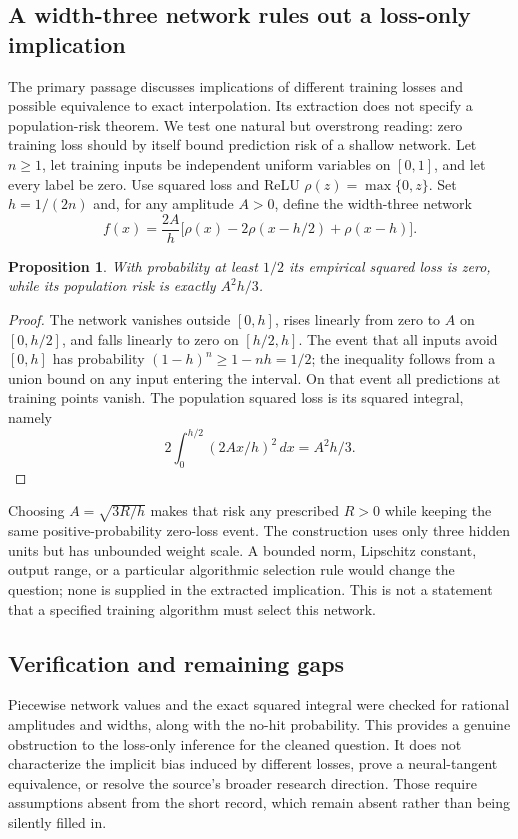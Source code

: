 \documentclass[11pt]{article}
\newtheorem{proposition}{Proposition}
\begin{document}
\subsection{A width-three network rules out a loss-only implication}
The primary passage discusses implications of different training losses and possible equivalence to exact interpolation. Its extraction does not specify a population-risk theorem. We test one natural but overstrong reading: zero training loss should by itself bound prediction risk of a shallow network.
Let $n\ge1$, let training inputs be independent uniform variables on $[0,1]$, and let every label be zero. Use squared loss and ReLU $\rho(z)=\max\{0,z\}$. Set $h=1/(2n)$ and, for any amplitude $A>0$, define the width-three network
\[
f(x)=\frac{2A}{h}\big[\rho(x)-2\rho(x-h/2)+\rho(x-h)\big].
\]
\begin{proposition}
With probability at least $1/2$ its empirical squared loss is zero, while its population risk is exactly $A^2h/3$.
\end{proposition}
\begin{proof}
The network vanishes outside $[0,h]$, rises linearly from zero to $A$ on $[0,h/2]$, and falls linearly to zero on $[h/2,h]$. The event that all inputs avoid $[0,h]$ has probability $(1-h)^n\ge1-nh=1/2$; the inequality follows from a union bound on any input entering the interval. On that event all predictions at training points vanish. The population squared loss is its squared integral, namely
\[
2\int_0^{h/2}(2Ax/h)^2\,dx=A^2h/3.
\]
\end{proof}
Choosing $A=\sqrt{3R/h}$ makes that risk any prescribed $R>0$ while keeping the same positive-probability zero-loss event. The construction uses only three hidden units but has unbounded weight scale. A bounded norm, Lipschitz constant, output range, or a particular algorithmic selection rule would change the question; none is supplied in the extracted implication. This is not a statement that a specified training algorithm must select this network.
\subsection{Verification and remaining gaps}
Piecewise network values and the exact squared integral were checked for rational amplitudes and widths, along with the no-hit probability. This provides a genuine obstruction to the loss-only inference for the cleaned question. It does not characterize the implicit bias induced by different losses, prove a neural-tangent equivalence, or resolve the source's broader research direction. Those require assumptions absent from the short record, which remain absent rather than being silently filled in.
\end{document}
